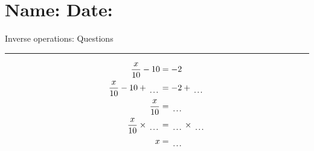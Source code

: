 \documentclass[12pt]{article}
\def \HeadingQuestions {\section*{\Large Name: \underline{\hspace{8cm}} \hfill Date: \underline{\hspace{3cm}}} \vspace{-3mm}
{Inverse operations: Questions} \vspace{1pt}\hrule}
\newcounter{minipagecount}
\begin{document}
\HeadingQuestions
\vspace{1mm}
\begin{multicols}{2}
\noindent{(\theminipagecount)}\hspace{0.1mm} %
\begin{minipage}[t]{0.45\textwidth} %
    \vspace{-26pt}  %
    \raggedright %
    \begin{align*} %
        \frac{x}{10} - 10 &= -2\\
        \frac{x}{10} - 10 + \dotuline{\hspace{5mm}} &= -2 + \dotuline{\hspace{5mm}}\\
        \frac{x}{10} &= \dotuline{\hspace{5mm}}\\
        \frac{x}{10} \times\dotuline{\hspace{5mm}} &= \dotuline{\hspace{5mm}} \times\dotuline{\hspace{5mm}}\\
        x &= \dotuline{\hspace{5mm}}\\
    \end{align*}
\end{minipage} %
\noindent{(\theminipagecount)}\hspace{0.1mm} %
\begin{minipage}[t]{0.45\textwidth} %
    \vspace{-26pt}  %

\end{minipage}
\end{multicols}
\end{document}
